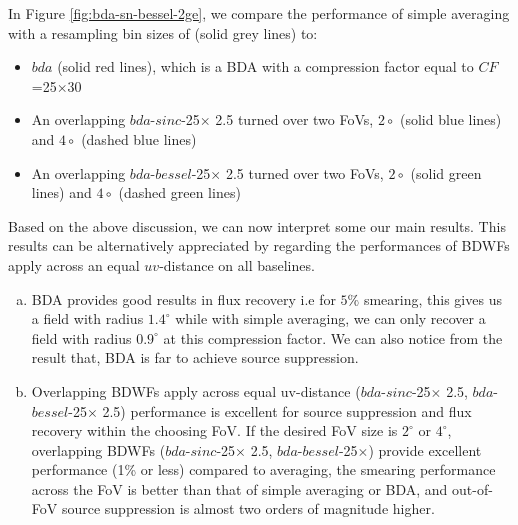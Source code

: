 \documentclass[useAMS,usenatbib]{mn2e}
\begin{document}
In Figure \ref{fig:bda-sn-bessel-2ge}, 
we compare the performance of simple averaging with a resampling bin sizes 
of  (solid grey lines) to:

 \begin{itemize}
  \item $bda$ (solid red lines), which is a BDA with a compression factor 
  equal to $CF$=25$\times$30 
  \item An overlapping $bda$-$sinc$-25$\times$ 2.5 turned over two FoVs, $2\circ$ (solid blue lines) 
  and $4\circ$ (dashed blue lines)
  \item An overlapping $bda$-$bessel$-25$\times$ 2.5 turned over two FoVs, $2\circ$ (solid green lines) 
  and $4\circ$ (dashed green lines)
\end{itemize}


Based on the above discussion, we can now interpret some our main results. 
This results can be alternatively appreciated by regarding the performances of BDWFs apply across 
an equal  $uv$-distance on all baselines. 

\begin{enumerate}[(a)]
\item BDA provides good results in flux recovery i.e for $5\%$ smearing, this gives us
a field with radius $1.4^{\circ}$ while with simple averaging, we can only recover a field with radius $0.9^{\circ}$  at this compression
factor. We can also notice from the result that, BDA is far to achieve source suppression.
\item Overlapping BDWFs apply across equal uv-distance ($bda$-$sinc$-25$\times$ 2.5, $bda$-$bessel$-25$\times$ 2.5)
performance is excellent for  source suppression and flux recovery within the choosing FoV.
 If the desired FoV size is $2^{\circ}$ or $4^{\circ}$, overlapping BDWFs ($bda$-$sinc$-25$\times$ 2.5,
$bda$-$bessel$-25$\times$) provide excellent performance (1\% or less) compared to
averaging, the smearing performance
across the FoV is  better than that of simple averaging or BDA, and out-of-FoV source suppression 
is almost two orders of magnitude higher.
 \end{enumerate}
\end{document}

